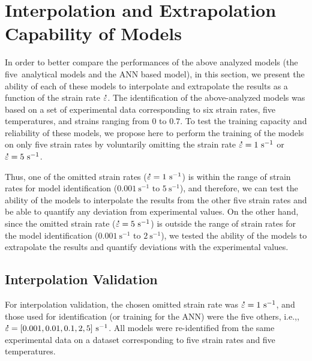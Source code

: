 \documentclass[metals,article,accept,pdftex,moreauthors]{Definitions/mdpi}
\makeatletter
\DeclareRobustCommand{\mdot}[1]{\accentset{\mbox{\bfseries .}}{#1}}
\DeclareRobustCommand{\ie}{i.e.,\@\xspace}
\DeclareRobustCommand{\ps}{\text{s}^{-1}}
\makeatother
\begin{document}
\section{Interpolation and Extrapolation Capability of Models\label{sec:IntExt}}

In order to better compare the performances of the above analyzed models (the five~analytical models and the ANN based model), in this section, we present the ability of each of these models to interpolate and extrapolate the results as a function of the strain rate $\mdot\varepsilon$.
The identification of the above-analyzed models was based on a set of experimental data corresponding to six strain rates, five temperatures, and strains ranging from $0$ to $0.7$.
To test the training capacity and reliability of these models, we propose here to perform the training of the models on only five strain rates by voluntarily omitting the strain rate $\mdot\varepsilon=1~\ps$ or $\mdot\varepsilon=5~\ps$.

Thus, one of the omitted strain rates ($\mdot\varepsilon=1~\ps$) is within the range of strain rates for model identification ($0.001~\ps\text{ to }5~\ps$), and therefore, we can test the ability of the models to interpolate the results from the other five strain rates and be able to quantify any deviation from experimental values.
On the other hand, since the omitted strain rate ($\mdot\varepsilon=5~\ps$) is outside the range of strain rates for the model identification ($0.001~\ps\text{ to }2~\ps$), we tested the ability of the models to extrapolate the results and quantify deviations with the experimental values.

\subsection{Interpolation Validation}

For interpolation validation, the chosen omitted strain rate was $\mdot\varepsilon=1~\ps$, and those used for identification (or training for the ANN) were the five others, \ie, $\mdot\varepsilon=[0.001, 0.01, 0.1, 2, 5]~\ps$.
All models were re-identified from the same experimental data on a dataset corresponding to five strain rates and five temperatures.
\end{document}
